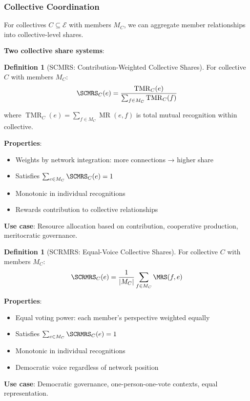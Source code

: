 \documentclass[11pt,a4paper]{article}
\theoremstyle{definition}
\newtheorem{definition}[theorem]{Definition}
\theoremstyle{remark}
\newcommand{\E}{\mathcal{E}}
\DeclareMathOperator{\MR}{MR}
\DeclareMathOperator{\TMR}{TMR}
\begin{document}
\subsubsection{Collective Coordination}

For collectives $C \subseteq \E$ with members $M_C$, we can aggregate member relationships into collective-level shares.

\textbf{Two collective share systems}:

\begin{definition}[SCMRS: Contribution-Weighted Collective Shares]
For collective $C$ with members $M_C$:
\[ \SCMRS_C(e) = \frac{\TMR_C(e)}{\sum_{f \in M_C} \TMR_C(f)} \]

where $\TMR_C(e) = \sum_{f \in M_C} \MR(e,f)$ is total mutual recognition within collective.

\textbf{Properties}:
\begin{itemize}
\item Weights by network integration: more connections → higher share
\item Satisfies $\sum_{e \in M_C} \SCMRS_C(e) = 1$
\item Monotonic in individual recognitions
\item Rewards contribution to collective relationships
\end{itemize}

\textbf{Use case}: Resource allocation based on contribution, cooperative production, meritocratic governance.
\end{definition}

\begin{definition}[SCRMRS: Equal-Voice Collective Shares]
For collective $C$ with members $M_C$:
\[ \SCRMRS_C(e) = \frac{1}{|M_C|} \sum_{f \in M_C} \MRS(f,e) \]

\textbf{Properties}:
\begin{itemize}
\item Equal voting power: each member's perspective weighted equally
\item Satisfies $\sum_{e \in M_C} \SCRMRS_C(e) = 1$
\item Monotonic in individual recognitions
\item Democratic voice regardless of network position
\end{itemize}

\textbf{Use case}: Democratic governance, one-person-one-vote contexts, equal representation.
\end{definition}
\end{document}
